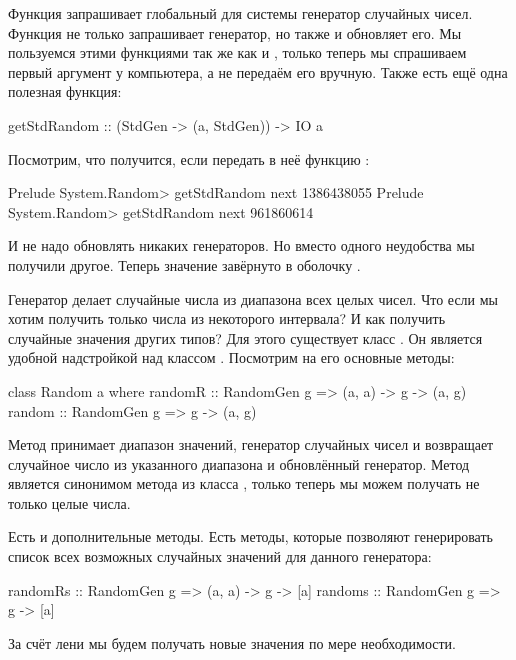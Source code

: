 Функция  запрашивает глобальный для системы 
генератор случайных чисел. Функция  не
только запрашивает генератор, но также и обновляет его.
Мы пользуемся этими функциями так же как и ,
только теперь мы спрашиваем первый аргумент у компьютера, а не передаём
его вручную. Также есть ещё одна полезная функция:

\begin{code}
getStdRandom    :: (StdGen -> (a, StdGen)) -> IO a
\end{code}

Посмотрим, что получится, если передать в неё функцию :

\begin{code}
Prelude System.Random> getStdRandom next 
1386438055
Prelude System.Random> getStdRandom next 
961860614
\end{code}

И не надо обновлять никаких генераторов. Но вместо одного
неудобства мы получили другое. Теперь значение завёрнуто в оболочку .

Генератор  делает случайные числа из
диапазона всех целых чисел. Что если мы хотим получить 
только числа из некоторого интервала? И как получить 
случайные значения других типов?
Для этого существует класс . Он является
удобной надстройкой над классом .
Посмотрим на его основные методы:

\begin{code}
class Random a where
    randomR :: RandomGen g => (a, a) -> g -> (a, g)
    random  :: RandomGen g => g -> (a, g)
\end{code}

Метод  принимает диапазон значений, генератор
случайных чисел и возвращает случайное число из указанного
диапазона и обновлённый генератор. Метод  
является синонимом метода  из класса ,
только теперь мы можем получать не только целые числа.

Есть и дополнительные методы. Есть методы, которые позволяют
генерировать список всех возможных случайных значений
для данного генератора:

\begin{code}
    randomRs :: RandomGen g => (a, a) -> g -> [a]
    randoms  :: RandomGen g => g -> [a]
\end{code}

За счёт лени мы будем получать новые значения по 
мере необходимости. 

